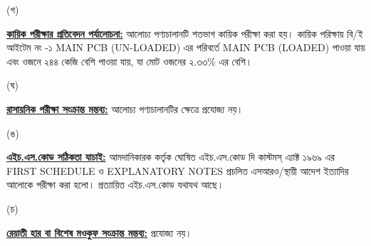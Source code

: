\documentclass[12pt]{article}
\begin{document}
\begin{minipage}[t]{0.05\linewidth}
\hspace{1em}
\end{minipage}
\begin{minipage}[t]{0.05\linewidth}
(গ)
\end{minipage}
\begin{minipage}[t]{0.90\linewidth}
\underline{\textbf{কায়িক পরীক্ষার প্রতিবেদন পর্যালোচনা:}}
আলোচ্য পণ্যচালানটি শতভাগ কায়িক পরীক্ষা করা হয়। কায়িক পরিক্ষায় বি/ই আইটেম নং -১ MAIN PCB (UN-LOADED) এর পরিবর্তে MAIN PCB (LOADED) পাওয়া যায়
এবং 
ওজনে ২৪৪ কেজি
বেশি পাওয়া যায়, যা মোট ওজনের
২.৩৩\% এর বেশি।
\\
\end{minipage}
\begin{minipage}[t]{0.05\linewidth}
\hspace{1em}
\end{minipage}
\begin{minipage}[t]{0.05\linewidth}
(ঘ)
\end{minipage}
\begin{minipage}[t]{0.90\linewidth}
\underline{\textbf{রাসায়নিক পরীক্ষা সংক্রান্ত মন্তব্য:}}
আলোচ্য পণ্যচালানটির ক্ষেত্রে প্রযোজ্য নয়।
\\
\end{minipage}
\begin{minipage}[t]{0.05\linewidth}
\hspace{1em}
\end{minipage}
\begin{minipage}[t]{0.05\linewidth}
(ঙ)
\end{minipage}
\begin{minipage}[t]{0.90\linewidth}
\underline{\textbf{এইচ.এস.কোড সঠিকতা যাচাই:}}
আমদানিকারক কর্তৃক ঘোষিত এইচ.এস.কোড দি কাস্টমস্ এ্যাক্ট ১৯৬৯ এর FIRST SCHEDULE ও
EXPLANATORY NOTES প্রচলিত এসআরও/স্থায়ী আদেশ ইত্যাদির আলোকে পরীক্ষা করা হলো।
প্রত্যায়িত এইচ.এস.কোড যথাযথ আছে।
\\
\end{minipage}
\newpage
\noindent
\begin{minipage}[t]{0.05\linewidth}
\hspace{1em}
\end{minipage}
\begin{minipage}[t]{0.05\linewidth}
(চ)
\end{minipage}
\begin{minipage}[t]{0.90\linewidth}
\underline{\textbf{রেয়াতী হার বা বিশেষ মওকুফ সংক্রান্ত মন্তব্য:}}
প্রযোজ্য নয়।
\\
\end{minipage}
\end{document}
